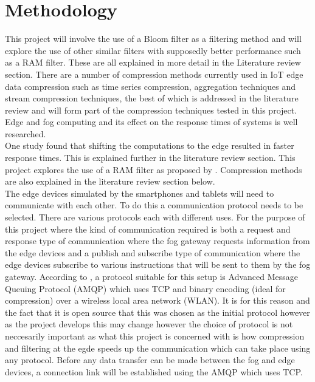 \documentclass[11pt,journal, a4paper]{IEEEtran}
\begin{document}
\section{Methodology}





\noindent
This project will involve the use of a Bloom filter as a filtering method and will explore the use of other similar filters with supposedly better performance such as a RAM filter. These are all explained in more detail in the Literature review section. There are a number of compression methods currently used in IoT edge data compression such as time series compression, aggregation techniques and stream compression techniques, the best of which is addressed in the literature review and will form part of the compression techniques tested in this project. Edge and fog computing and its effect on the response times of systems is well researched. \\

\noindent
One study \cite{accelerating} found that shifting the computations to the edge resulted in faster response times. This is explained further in the literature review section. This project explores the use of a RAM filter as proposed by \cite{Bloom}. Compression methods are also explained in the literature review section below.\\

\noindent
The edge devices simulated by the smartphones and tablets will need to communicate with each other. To do this a communication protocol needs to be selected. There are various protocols each with different uses. For the purpose of this project where the kind of communication required is both a request and response type of communication where the fog gateway requests information from the edge devices and a publish and subscribe type of communication where the edge devices subscribe to various instructions that will be sent to them by the fog gateway. According to \cite{Prot}, a protocol suitable for this setup is Advanced Message Queuing Protocol (AMQP) which uses TCP and binary encoding (ideal for compression) over a wireless local area network (WLAN). It is for this reason and the fact that it is open source that this was chosen as the initial protocol however as the project develops this may change however the choice of protocol is not neccesarily important as what this project is concerned with is how compression and filtering at the egde speeds up the communication which can take place using any protocol. Before any data transfer can be made between the fog and edge devices, a connection link will be established using the AMQP which uses TCP.\\
\end{document}

